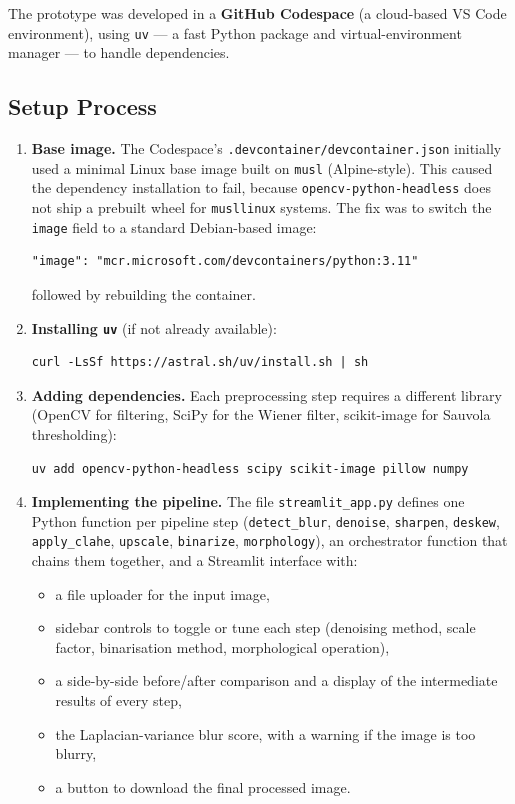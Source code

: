 \documentclass[12pt, a4paper]{article}
\begin{document}
The prototype was developed in a \textbf{GitHub Codespace} (a cloud-based VS Code environment), using \texttt{uv} --- a fast Python package and virtual-environment manager --- to handle dependencies.

\subsection{Setup Process}

\begin{enumerate}
  \item \textbf{Base image.} The Codespace's \texttt{.devcontainer/devcontainer.json} initially used a minimal Linux base image built on \texttt{musl} (Alpine-style). This caused the dependency installation to fail, because \texttt{opencv-python-headless} does not ship a prebuilt wheel for \texttt{musllinux} systems. The fix was to switch the \texttt{image} field to a standard Debian-based image:
\begin{lstlisting}
"image": "mcr.microsoft.com/devcontainers/python:3.11"
\end{lstlisting}
  followed by rebuilding the container.

  \item \textbf{Installing \texttt{uv}} (if not already available):
\begin{lstlisting}
curl -LsSf https://astral.sh/uv/install.sh | sh
\end{lstlisting}

  \item \textbf{Adding dependencies.} Each preprocessing step requires a different library (OpenCV for filtering, SciPy for the Wiener filter, scikit-image for Sauvola thresholding):
\begin{lstlisting}
uv add opencv-python-headless scipy scikit-image pillow numpy
\end{lstlisting}

  \item \textbf{Implementing the pipeline.} The file \texttt{streamlit\_app.py} defines one Python function per pipeline step (\texttt{detect\_blur}, \texttt{denoise}, \texttt{sharpen}, \texttt{deskew}, \texttt{apply\_clahe}, \texttt{upscale}, \texttt{binarize}, \texttt{morphology}), an orchestrator function that chains them together, and a Streamlit interface with:
  \begin{itemize}
    \item a file uploader for the input image,
    \item sidebar controls to toggle or tune each step (denoising method, scale factor, binarisation method, morphological operation),
    \item a side-by-side before/after comparison and a display of the intermediate results of every step,
    \item the Laplacian-variance blur score, with a warning if the image is too blurry,
    \item a button to download the final processed image.
  \end{itemize}


\end{enumerate}
\end{document}
